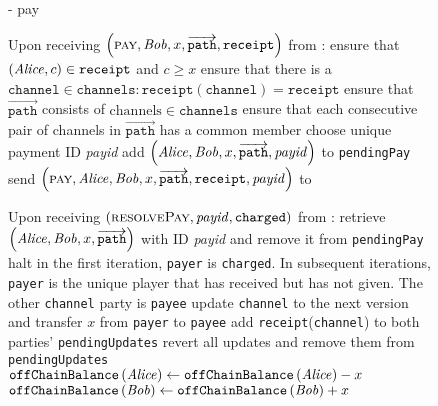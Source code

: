   \begin{figure}[H]
    \begin{systembox}{\fpaynet - pay}
      \begin{algorithmic}[1]
        \State Upon receiving $\left(\textsc{pay}, \mathit{Bob}, x,
        \overrightarrow{\mathtt{path}}, \mathtt{receipt}\right)$ from \alice:
        \Indent
          \State ensure that $\left(\mathit{Alice}, c\right) \in \mathtt{receipt}$ and
          $c \geq x$
          \State ensure that there is a $\mathtt{channel} \in \mathtt{channels}
          : \mathtt{receipt}\left(\mathtt{channel}\right) = \mathtt{receipt}$
          \State ensure that $\overrightarrow{\mathtt{path}}$ consists of
          $\mathrm{channels} \in \mathtt{channels}$
          \State ensure that each consecutive pair of channels in
          $\overrightarrow{\mathtt{path}}$ has a common member
          \State choose unique payment ID \textit{payid}
          \State add $\left(\mathit{Alice}, \mathit{Bob}, x, \overrightarrow{\mathtt{path}},
          \mathit{payid}\right)$ to \texttt{pendingPay}
          \State send $\left(\textsc{pay}, \mathit{Alice}, \mathit{Bob}, x,
          \overrightarrow{\mathtt{path}}, \mathtt{receipt},
          \mathit{payid}\right)$ to \simulator
        \EndIndent
        \Statex

        \State Upon receiving $\left(\textsc{resolvePay}, \mathit{payid},
        \mathtt{charged}\right)$ from \simulator:
        \Indent
          \State retrieve $\left(\mathit{Alice}, \mathit{Bob}, x,
          \overrightarrow{\mathtt{path}}\right)$ with ID \textit{payid} and
          remove it from \texttt{pendingPay}
            \State \Return
            \State halt
          \EndIf
            \State in the first iteration, \texttt{payer} is \texttt{charged}. In
            subsequent iterations, \texttt{payer} is the unique player that has
            received but has not given. The other \texttt{channel} party is
            \texttt{payee}
              \State update \texttt{channel} to the next version and transfer
              $x$ from \texttt{payer} to \texttt{payee}
              \State add \texttt{receipt}(\texttt{channel}) to both parties'
              \texttt{pendingUpdates}
            \Else
              \State revert all updates and remove them from
              \texttt{pendingUpdates}
            \EndIf
          \EndFor
            \State $\mathtt{offChainBalance}\left(\mathit{Alice}\right) \gets
            \mathtt{offChainBalance}\left(\mathit{Alice}\right) - x$
          \EndIf
          \State $\mathtt{offChainBalance}\left(\mathit{Bob}\right) \gets
          \mathtt{offChainBalance}\left(\mathit{Bob}\right) + x$
        \EndIndent
      \end{algorithmic}
    \end{systembox}
    \caption{}
    \label{alg:fpaynet:pay}
  \end{figure}

